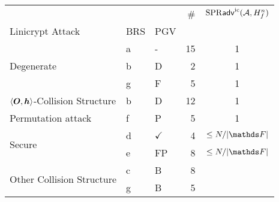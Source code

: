 \begin{tabular}{lllrc}
\toprule
 &  &  & \# & $\mathrm{SPR}\mathsf{adv}^{\mathrm{ic}}(\mathcal{A}, H^n_f)$ \\
Linicrypt Attack & BRS & PGV &  &  \\
\midrule
\multirow[c]{3}{*}{Degenerate} & a & - & 15 & 1 \\
\cline{2-5} \cline{3-5}
 & b & D & 2 & 1 \\
\cline{2-5} \cline{3-5}
 & g & F & 5 & 1 \\
\cline{1-5} \cline{2-5} \cline{3-5}
$\langle\boldsymbol{O}, \boldsymbol h\rangle$-Collision Structure & b & D & 12 & 1 \\
\cline{1-5} \cline{2-5} \cline{3-5}
Permutation attack & f & P & 5 & 1 \\
\cline{1-5} \cline{2-5} \cline{3-5}
\multirow[c]{2}{*}{Secure} & d & $\checkmark$ & 4 & $\leq N/|\F|$ \\
\cline{2-5} \cline{3-5}
 & e & FP & 8 & $\leq N/|\F|$ \\
\cline{1-5} \cline{2-5} \cline{3-5}
\multirow[c]{2}{*}{Other Collision Structure} & c & B & 8 &  \\
\cline{2-5} \cline{3-5}
 & g & B & 5 &  \\
\cline{1-5} \cline{2-5} \cline{3-5}
\bottomrule
\end{tabular}
